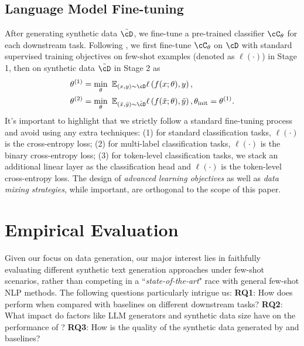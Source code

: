 \subsection{Language Model Fine-tuning}
After generating synthetic data $\tilde{\cD}$, we fine-tune a pre-trained classifier $\cC_{\theta}$ for each downstream task. Following \citet{meng2023tuning}, we first fine-tune $\cC_{\theta}$ on $\cD$ with standard supervised training objectives on few-shot examples (denoted as $\ell(\cdot)$) in Stage 1, then on synthetic data $\tilde{\cD}$ in Stage 2 as  
\begin{align}
\setlength{\abovedisplayskip}{6pt}
\setlength{\belowdisplayskip}{6pt}
    \label{eq:stage1}
    \theta^{(1)} &= \min_{\theta}~\mathbb{E}_{(x, y) \sim \cD} \ell\left( f(x; \theta), y \right), \nonumber \\
    \theta^{(2)} &=  \min_{\theta}~\mathbb{E}_{(\tilde{x}, \tilde{y}) \sim \tilde{\cD}} \ell\left( f(\tilde{x}; \theta), \tilde{y} \right),  \theta_{\text{init}} = \theta^{(1)}.
    \nonumber
\end{align} 
It's important to highlight that we strictly follow a standard fine-tuning process and avoid using any extra techniques: (1) for standard classification tasks, $\ell(\cdot)$ is the cross-entropy loss; (2) for multi-label classification tasks, $\ell(\cdot)$ is the binary cross-entropy loss; 
(3) for token-level classification tasks, we stack an additional linear layer as the classification head and  $\ell(\cdot)$ is the token-level cross-entropy loss. 
The design of \emph{advanced learning objectives} as well as \emph{data mixing strategies}, while important, are orthogonal to the scope of this paper. 

\section{Empirical Evaluation}
Given our focus on data generation, our major interest lies in faithfully evaluating different synthetic text generation approaches under few-shot scenarios, rather than competing in a ``\emph{state-of-the-art}" race with general few-shot NLP methods. 
The following questions particularly intrigue us:
\textbf{RQ1}: How does {\ours} perform when compared with baselines on different downstream tasks?  
\textbf{RQ2}: What impact do factors like LLM generators and synthetic data size have on the performance of {\ours}?
\textbf{RQ3}: How is the quality of the synthetic data generated by {\ours} and baselines?

